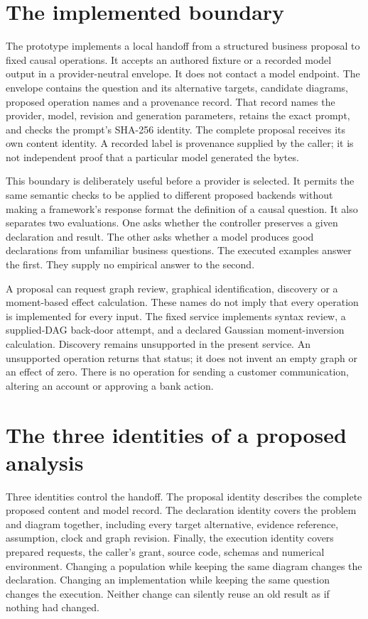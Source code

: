 \section{The implemented boundary}

The prototype implements a local handoff from a structured business proposal to
fixed causal operations. It accepts an authored fixture or a recorded model
output in a provider-neutral envelope. It does not contact a model endpoint.
The envelope contains the question and its alternative targets, candidate
diagrams, proposed operation names and a provenance record. That record names
the provider, model, revision and generation parameters, retains the exact
prompt, and checks the prompt's SHA-256 identity. The complete proposal receives
its own content identity. A recorded label is provenance supplied by the caller;
it is not independent proof that a particular model generated the bytes.

This boundary is deliberately useful before a provider is selected. It permits
the same semantic checks to be applied to different proposed backends without
making a framework's response format the definition of a causal question.
It also separates two evaluations. One asks whether the controller preserves a
given declaration and result. The other asks whether a model produces good
declarations from unfamiliar business questions. The executed examples answer
the first. They supply no empirical answer to the second.

A proposal can request graph review, graphical identification, discovery or a
moment-based effect calculation. These names do not imply that every operation
is implemented for every input. The fixed service implements syntax review,
a supplied-DAG back-door attempt, and a declared Gaussian moment-inversion
calculation. Discovery remains unsupported in the present service. An unsupported
operation returns that status; it does not invent an empty graph or an effect
of zero. There is no operation for sending a customer communication, altering
an account or approving a bank action.

\section{The three identities of a proposed analysis}

Three identities control the handoff. The proposal identity describes the
complete proposed content and model record. The declaration identity covers the
problem and diagram together, including every target alternative, evidence
reference, assumption, clock and graph revision. Finally, the execution identity
covers prepared requests, the caller's grant, source code, schemas and numerical
environment. Changing a population while keeping the same diagram changes the
declaration. Changing an implementation while keeping the same question changes
the execution. Neither change can silently reuse an old result as if nothing
had changed.


